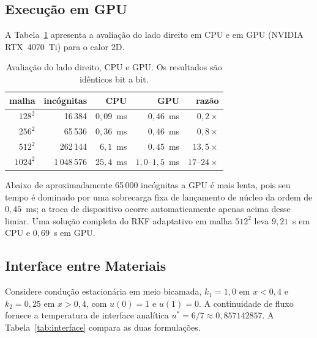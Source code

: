 \documentclass[10pt,brazil,english]{article}
\begin{document}
\subsection{Execução em GPU}

A Tabela~\ref{tab:gpu} apresenta a avaliação do lado direito em CPU e em GPU (NVIDIA RTX~4070~Ti) para o calor 2D.

\begin{table}[!htb]
\centering
\caption{Avaliação do lado direito, CPU e GPU. Os resultados são idênticos bit a bit.}
\label{tab:gpu}
\begin{tabular}{rrrrr}
\toprule
malha & incógnitas & CPU & GPU & razão \\
\midrule
$128^2$  & 16\,384      & $0{,}09$~ms & $0{,}46$~ms & $0{,}2\times$ \\
$256^2$  & 65\,536      & $0{,}36$~ms & $0{,}46$~ms & $0{,}8\times$ \\
$512^2$  & 262\,144     & $6{,}1$~ms  & $0{,}45$~ms & $13{,}5\times$ \\
$1024^2$ & 1\,048\,576  & $25{,}4$~ms & $1{,}0$--$1{,}5$~ms & $17$--$24\times$ \\
\bottomrule
\end{tabular}
\end{table}

Abaixo de aproximadamente 65\,000 incógnitas a GPU é mais lenta, pois seu tempo é dominado por uma sobrecarga fixa de lançamento de núcleo da ordem de $0{,}45$~ms; a troca de dispositivo ocorre automaticamente apenas acima desse limiar. Uma solução completa do RKF adaptativo em malha $512^2$ leva $9{,}21$~s em CPU e $0{,}69$~s em GPU.

\subsection{Interface entre Materiais}
\label{sec:interface}

Considere condução estacionária em meio bicamada, $k_1 = 1{,}0$ em $x < 0{,}4$ e $k_2 = 0{,}25$ em $x > 0{,}4$, com $u(0)=1$ e $u(1)=0$. A continuidade de fluxo fornece a temperatura de interface analítica $u^\ast = 6/7 \approx 0{,}857142857$. A Tabela~\ref{tab:interface} compara as duas formulações.

\begin{table}[!htb]
\centering
\caption{Interface entre materiais, $N=81$. A forma expandida executa sem erro e viola a conservação de fluxo.}
\label{tab:interface}
\end{table}
\end{document}
